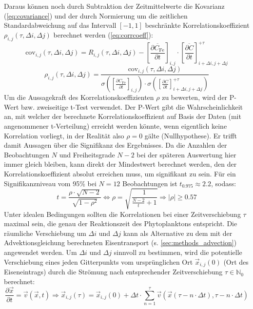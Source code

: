 \documentclass[12pt,a4paper,onecolumn]{scrartcl}
\begin{document}
Daraus können noch durch Subtraktion der Zeitmittelwerte die Kovarianz (\ref{eq:covariance}) und der durch Normierung um die zeitlichen Standardabweichung auf das Intervall $[-1,1]$ beschränkte Korrelationskoeffizient $\rho_{i,j}(\tau,\Delta i, \Delta j)$ berechnet werden (\ref{eq:corrcoeff}):
\begin{equation}
\text{cov}_{i,j}(\tau,\Delta i, \Delta j) = R_{i,j}(\tau,\Delta i, \Delta j)-\left[\frac{\overline{\partial C_\text{Fe}}}{\partial t}\right]_{i,j} \cdot \left[\frac{\overline{\partial C}}{\partial t}\right]_{i+\Delta i,j+\Delta j}^{+\tau} \label{eq:covariance}
\end{equation}
\begin{equation}
\rho_{i,j}(\tau,\Delta i, \Delta j) = \frac{\text{cov}_{i,j}(\tau,\Delta i, \Delta j)}{\sigma \left(\left[\frac{\partial C_\text{Fe}}{\partial t}\right]_{i,j}\right) \cdot \sigma\left(\left[\frac{\partial C}{\partial t}\right]_{i+\Delta i ,j+\Delta j}^{+\tau}\right)} \label{eq:corrcoeff}
\end{equation}
Um die Aussagekraft des Korrelationskoeffizienten $\rho$ zu bewerten, wird der P-Wert bzw. zweiseitige t-Test verwendet. Der P-Wert gibt die Wahrscheinlichkeit an, mit welcher der berechnete Korrelationskoeffizient auf Basis der Daten (mit angenommener t-Verteilung) erreicht werden könnte, wenn eigentlich keine Korrelation vorliegt, in der Realität also $\rho=0$ gälte (Nullhypothese). Er trifft damit Aussagen über die Signifikanz des Ergebnisses. Da die Anzahlen der Beobachtungen $N$ und Freiheitsgrade $N-2$ bei der späteren Auswertung hier immer gleich bleiben, kann direkt der Mindestwert berechnet werden, den der Korrelationskoeffizient absolut erreichen muss, um signifikant zu sein. Für ein Signifikanzniveau vom 95\% bei $N = 12$ Beobachtungen ist $t_{0.975}\approx 2.2$, sodass:
\begin{equation}
t = \frac{\rho \cdot \sqrt{N-2}}{\sqrt{1-\rho^2}} \Leftrightarrow \rho = \sqrt{\frac{1}{\frac{N-2}{t}+1}} \Rightarrow |\rho| \geq 0.57 
\end{equation}
Unter idealen Bedingungen sollten die Korrelationen bei einer Zeitverschiebung $\tau$ maximal sein, die genau der Reaktionszeit des Phytoplanktons entspricht. Die räumliche Verschiebung um $\Delta i$ und $\Delta j$ kann als Alternative zu dem mit der Advektionsgleichung berechneten Eisentransport (s. \ref{sec:methods_advection}) angewendet werden. Um $\Delta i$ und $\Delta j$ sinnvoll zu bestimmen, wird die potentielle Verschiebung eines jeden Gitterpunkts vom ursprünglichen Ort $\vec{x}_{i,j}(0)$ (Ort des Eiseneintrags) durch die Strömung nach entsprechender Zeitverschiebung $\tau \in \mathbb{N}_0$ berechnet:
\begin{equation}
\frac{\partial \vec{x}}{\partial t} = \vec{v}(\vec{x},t) \Rightarrow \vec{x}_{i,j}(\tau) =   \vec{x}_{i,j}(0) + \Delta t \cdot \sum\limits_{n = 1}^{\tau} \vec{v} \left( \vec{x}(\tau - n \cdot \Delta t),\tau - n \cdot \Delta t \right) \label{eq:position_shift}
\end{equation}
\end{document}
